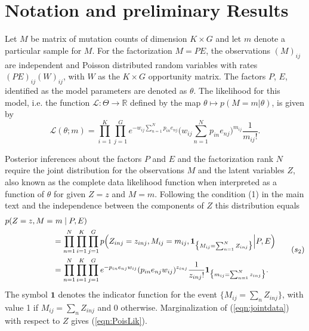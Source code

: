 \documentclass[11pt]{amsart}
\theoremstyle{definition}
\theoremstyle{remark}
\begin{document}
\tableofcontents 

\section{Notation and preliminary Results}
Let $M$ be matrix of mutation counts of dimension $K\times G$ and let
$m$ denote a particular sample for $M$. For the factorization $M=PE$,
the observations $(M)_{ij}$ are independent and Poisson distributed
random variables with rates $(PE)_{ij}(W)_{ij}$, with $W$ as the
$K\times G$ opportunity matrix. The factors $P$, $E$, identified as
the model parameters are denoted as $\theta$. The likelihood for this
model, i.e. the function $\mathcal L: \Theta \to \mathbb R$ defined by
the map $\theta \mapsto p(M=m|\theta)$, is given by
\begin{equation}
  \label{eqn:PoisLik}
   \mathcal L(\theta; m) 
   =
    \prod_{i=1}^K \prod_{j=1}^G e^{-w_{ij}\sum_{n=1}^{N}p_{in}e_{nj}}
    \Big(w_{ij}\sum_{n=1}^{N}p_{in}e_{nj}\Big)^{m_{ij}}
    \frac{1}{m_{ij}!}.\tag{$s_1$}
\end{equation}

Posterior inferences about the factors $P$ and $E$ and the
factorization rank $N$ require the joint distribution for the
observations $M$ and the latent variables $Z$, also known as the
complete data likelihood function when interpreted as a function of
$\theta$ for given $Z=z$ and $M=m$. Following the condition
(1) in the main text and the independence between
the components of $Z$ this distribution equals
\begin{equation}
   \label{eqn:jointdata}
 \begin{aligned}
    p(Z = z, M =&\ m \mid P, E) \notag\\
  &= 
    \prod_{n=1}^N\prod_{i=1}^K\prod_{j=1}^G p\Big(Z_{inj} = z_{inj},
    M_{ij} = m_{ij}, \mathbf{1}_{\big\{M_{ij} = \sum_{n=1}^N
      Z_{inj}\big\}} \Big| P, E\Big)  \notag\\ 
  &=
    \prod_{n=1}^N\prod_{i=1}^K\prod_{j=1}^G e^{-p_{in}e_{nj}w_{ij}}
    (p_{in}e_{nj}w_{ij})^{z_{inj}} \frac{1}{z_{inj}!}
    \mathbf{1}_{\big\{m_{ij} = \sum_{n=1}^N z_{inj}\big\}}.
 \end{aligned}
 \tag{$s_2$}
\end{equation}
The symbol $\mathbf{1}$ denotes the indicator function for the 
event $\big\{M_{ij} = \sum_n Z_{inj}\big\}$, with value 1 if $M_{ij} =  
\sum_n  Z_{inj}$ and 0 otherwise. Marginalization of
(\ref{eqn:jointdata}) with respect to $Z$ gives  (\ref{eqn:PoisLik}).
\end{document}
